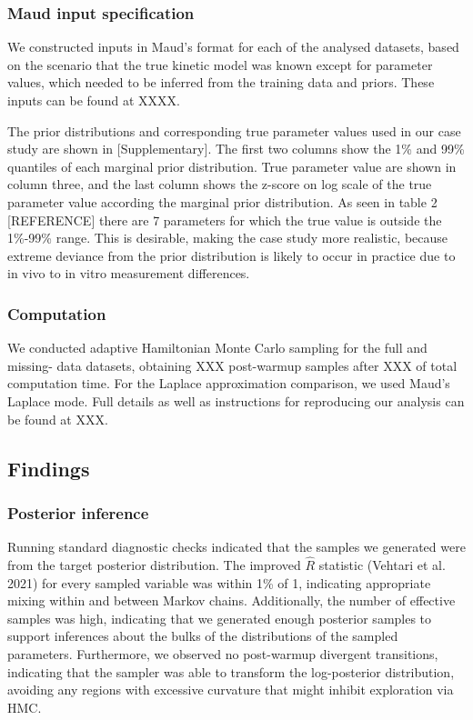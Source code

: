 \documentclass[
  letterpaper,
  DIV=11,
  numbers=noendperiod]{scrartcl}
\begin{document}
\hypertarget{maud-input-specification}{%
\subsubsection{Maud input
specification}\label{maud-input-specification}}

We constructed inputs in Maud's format for each of the analysed
datasets, based on the scenario that the true kinetic model was known
except for parameter values, which needed to be inferred from the
training data and priors. These inputs can be found at XXXX.

The prior distributions and corresponding true parameter values used in
our case study are shown in {[}Supplementary{]}. The first two columns
show the 1\% and 99\% quantiles of each marginal prior distribution.
True parameter value are shown in column three, and the last column
shows the z-score on log scale of the true parameter value according the
marginal prior distribution. As seen in table 2 {[}REFERENCE{]} there
are 7 parameters for which the true value is outside the 1\%-99\% range.
This is desirable, making the case study more realistic, because extreme
deviance from the prior distribution is likely to occur in practice due
to in vivo to in vitro measurement differences.

\hypertarget{computation}{%
\subsubsection{Computation}\label{computation}}

We conducted adaptive Hamiltonian Monte Carlo sampling for the full and
missing- data datasets, obtaining XXX post-warmup samples after XXX of
total computation time. For the Laplace approximation comparison, we
used Maud's Laplace mode. Full details as well as instructions for
reproducing our analysis can be found at XXX.

\hypertarget{findings}{%
\subsection{Findings}\label{findings}}

\hypertarget{posterior-inference}{%
\subsubsection{Posterior inference}\label{posterior-inference}}

Running standard diagnostic checks indicated that the samples we
generated were from the target posterior distribution. The improved
\(\hat{R}\) statistic (Vehtari et al. 2021) for every sampled variable
was within 1\% of 1, indicating appropriate mixing within and between
Markov chains. Additionally, the number of effective samples was high,
indicating that we generated enough posterior samples to support
inferences about the bulks of the distributions of the sampled
parameters. Furthermore, we observed no post-warmup divergent
transitions, indicating that the sampler was able to transform the
log-posterior distribution, avoiding any regions with excessive
curvature that might inhibit exploration via HMC.
\end{document}
